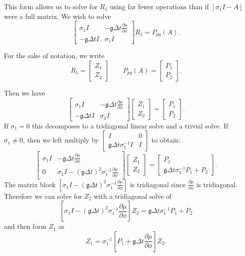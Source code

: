 \documentclass{csri19}
\newcommand{\CFKg}{\mathfrak{g}}
\begin{document}
This form allows us to solve for $R_1$ using far fewer operations than if 
$\left[\sigma_1I-A\right]$ were a full matrix. We wish to solve 
\[ \begin{bmatrix} \sigma_1 I  & -\CFKg\Delta t \frac{\partial\mu}{\partial\phi} \\
 -\CFKg\Delta t I          & \sigma_1 I \end{bmatrix} R_1 = P_{pq}(A).\]

For the sake of notation, we write
\[ R_1 = \begin{bmatrix} Z_1 \\ Z_2\end{bmatrix} \qquad P_{pq}(A) = \begin{bmatrix} P_1 \\ P_2\end{bmatrix}.\]

Then we have
\[\begin{bmatrix} \sigma_1 I  & -\CFKg\Delta t \frac{\partial\mu}{\partial\phi} \\
           -\CFKg\Delta t I & \sigma_1 I \end{bmatrix}
\begin{bmatrix} Z_1 \\
 Z_2 \end{bmatrix} = 
\begin{bmatrix} P_1 \\
 P_2 \end{bmatrix}.\]
If $\sigma_1 = 0$ this decomposes to a tridiagonal linear solve and a trivial solve. 
If $\sigma_1 \neq 0$, then we left multiply by $\begin{bmatrix} I & 0 \\
                                     \CFKg\Delta t \sigma_1^{-1}I & I \end{bmatrix}$ to obtain:
\[\begin{bmatrix} 
 \sigma_1 I  & -\CFKg\Delta t \frac{\partial\mu}{\partial\phi} \\
         0 & \sigma_1 I -\left(\CFKg\Delta t\right)^2  \sigma_1^{-1}\frac{\partial\mu}{\partial\phi}
 \end{bmatrix}
 \begin{bmatrix} Z_1 \\
 Z_2 \end{bmatrix} = 
\begin{bmatrix} P_1 \\
 \CFKg\Delta t \sigma_1^{-1} P_1 +  P_2 \end{bmatrix}.\]
The matrix block $\left[\sigma_1 I -\left(\CFKg\Delta t\right)^2\sigma_1^{-1}\frac{\partial\mu}{\partial\phi}\right]$ 
is tridiagonal since $\frac{\partial\mu}{\partial\phi}$ is tridiagonal. 
Therefore we can solve for $Z_2$ with a tridiagonal solve of 
\[\left[\sigma_1 I -\left(\CFKg\Delta t \right)^2  \sigma_1^{-1}\frac{\partial\mu}{\partial\phi}\right]Z_2
 = \CFKg\Delta t\sigma_1^{-1} P_1 +  P_2\]
and then form $Z_1$ as 
\[Z_1 = \sigma_1^{-1}\left[P_1 + \CFKg\Delta t\frac{\partial \mu}{\partial \phi}\right] Z_2.\]
\end{document}
